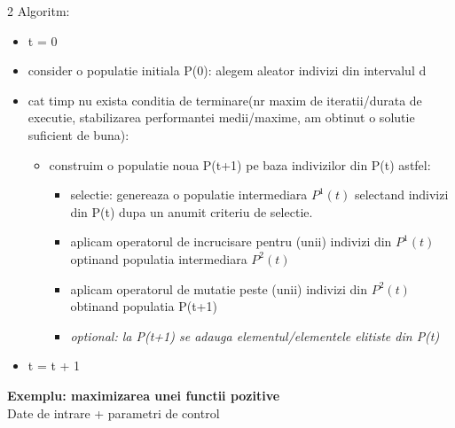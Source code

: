 \documentclass[a4paper]{article}
\begin{document}
\begin{multicols}{2}
Algoritm:
\begin{itemize}
    \item t = 0
    \item consider o populatie initiala P(0): alegem aleator indivizi din intervalul d
    \item cat timp nu exista conditia de terminare(nr maxim de iteratii/durata de executie, stabilizarea performantei medii/maxime, am obtinut o solutie suficient de buna):
    \begin{itemize}
    \item construim o populatie noua P(t+1) pe baza indivizilor din P(t) astfel:
    \begin{itemize}
    \item selectie: genereaza o populatie intermediara $P^1(t)$ selectand indivizi din P(t) dupa un anumit criteriu de selectie.
    \item aplicam operatorul de incrucisare pentru (unii) indivizi din $P^1(t)$ optinand populatia intermediara $P^2(t)$
    \item aplicam operatorul de mutatie peste (unii) indivizi din $P^2(t)$ obtinand populatia P(t+1)
    \item \textit{optional: la P(t+1) se adauga elementul/elementele elitiste din P(t)}
    \end{itemize}
    \end{itemize}
    \item t = t + 1
\end{itemize}

\textbf{Exemplu: maximizarea unei functii pozitive} \\

Date de intrare + parametri de control


\end{multicols}
\end{document}
